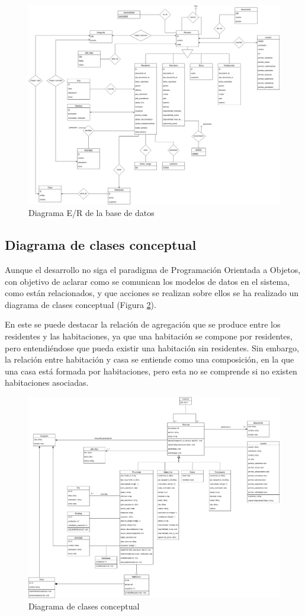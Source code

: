 \begin{figure}[]
    \centering
    \includegraphics[width=\textwidth]{diseno/base_de_datos/ER.png}
    \caption{Diagrama E/R de la base de datos}
    \label{fig:er}
\end{figure}

\subsection{Diagrama de clases conceptual}

Aunque el desarrollo no siga el paradigma de Programación Orientada a Objetos, con objetivo de aclarar como se comunican los modelos de datos en el sistema, como están relacionados, y que acciones se realizan sobre ellos se ha realizado un diagrama de clases conceptual (Figura \ref{fig:dc}). 

En este se puede destacar la relación de agregación que se produce entre los residentes y las habitaciones, ya que una habitación se compone por residentes, pero entendiéndose que pueda existir una habitación sin residentes. Sin embargo, la relación entre habitación y casa se entiende como una composición, en la que una casa está formada por habitaciones, pero esta no se comprende si no existen habitaciones asociadas.

\begin{figure}[]
    \centering
    \includegraphics[width=\textwidth]{diseno/sistema/DiagramaDeClases.png}
    \caption{Diagrama de clases conceptual}
    \label{fig:dc}
\end{figure}

